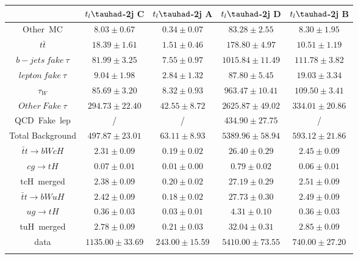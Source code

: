 \centering
\begin{tabular}{ccccc} \toprule\toprule
 & $t_{l}\tauhad$-2j C & $t_{l}\tauhad$-2j A & $t_{l}\tauhad$-2j D & $t_{l}\tauhad$-2j B\\\midrule
Other~MC & $8.03\pm0.67$ & $0.34\pm0.07$ & $83.28\pm2.55$ & $8.30\pm1.95$\\
$t\bar{t}$ & $18.39\pm1.61$ & $1.51\pm0.46$ & $178.80\pm4.97$ & $10.51\pm1.19$\\
$b-jets~fake~\tau$ & $81.99\pm3.25$ & $7.55\pm0.97$ & $1015.84\pm11.49$ & $111.78\pm3.82$\\
$lepton~fake~\tau$ & $9.04\pm1.98$ & $2.84\pm1.32$ & $87.80\pm5.45$ & $19.03\pm3.34$\\
$\tau_{W}$ & $85.69\pm3.20$ & $8.32\pm0.93$ & $963.47\pm10.41$ & $109.50\pm3.41$\\
$Other~Fake~\tau$ & $294.73\pm22.40$ & $42.55\pm8.72$ & $2625.87\pm49.02$ & $334.01\pm20.86$\\
QCD~Fake~lep &  / &  / & $434.90\pm27.75$ &  /\\\midrule
Total Background & $497.87\pm23.01$ & $63.11\pm8.93$ & $5389.96\pm58.94$ & $593.12\pm21.86$\\\midrule\midrule
$\bar{t}t\to bWcH$ & $2.31\pm0.09$ & $0.19\pm0.02$ & $26.40\pm0.29$ & $2.45\pm0.09$\\
$cg\to tH$ & $0.07\pm0.01$ & $0.01\pm0.00$ & $0.79\pm0.02$ & $0.06\pm0.01$\\
tcH~merged & $2.38\pm0.09$ & $0.20\pm0.02$ & $27.19\pm0.29$ & $2.51\pm0.09$\\\midrule
$\bar{t}t\to bWuH$ & $2.42\pm0.09$ & $0.18\pm0.02$ & $27.73\pm0.30$ & $2.49\pm0.09$\\
$ug\to tH$ & $0.36\pm0.03$ & $0.03\pm0.01$ & $4.31\pm0.10$ & $0.36\pm0.03$\\
tuH~merged & $2.78\pm0.09$ & $0.21\pm0.03$ & $32.04\pm0.31$ & $2.85\pm0.09$\\\midrule\midrule
data & $1135.00\pm33.69$ & $243.00\pm15.59$ & $5410.00\pm73.55$ & $740.00\pm27.20$\\
\bottomrule\bottomrule\\
\end{tabular}
